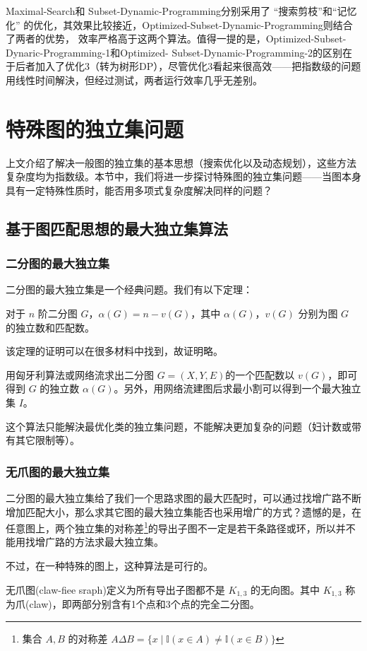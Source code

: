 \documentclass[lang=cn,11pt,a4paper]{elegantpaper}
\newcommand{\I}{\mathbb{I}}
\begin{document}
Maximal-Search和 Subset-Dynamic-Programming分别采用了 “搜索剪枝”和“记忆化” 的优化，其效果比较接近，Optimized-Subset-Dynamic-Programming则结合了两者的优势， 效率严格高于这两个算法。值得一提的是，Optimized-Subset-Dynaric-Programming-1和Optimized- Subset-Dynamic-Programming-2的区别在于后者加入了优化3（转为树形DP），尽管优化3看起来很高效——把指数级的问题用线性时间解決，但经过测试，两者运行效率几乎无差别。

\section{特殊图的独立集问题}
上文介绍了解决一般图的独立集的基本思想（搜索优化以及动态规划），这些方法复杂度均为指数级。本节中，我们将进一步探讨特殊图的独立集问题——当图本身具有一定特殊性质时，能否用多项式复杂度解决同样的问题？

\subsection{基于图匹配思想的最大独立集算法}
\subsubsection{二分图的最大独立集}
二分图的最大独立集是一个经典问题。我们有以下定理：
\begin{theorem}
    对于 $n$ 阶二分图 $G$，$\alpha(G) = n - v(G)$，其中 $\alpha(G)$，$v(G)$ 分别为图 $G$ 的独立数和匹配数。
\end{theorem}

该定理的证明可以在很多材料中找到，故证明略。

用匈牙利算法或网络流求出二分图 $G =(X, Y, E)$的一个匹配数以 $v(G)$，即可得到 $G$ 的独立数 $\alpha(G)$。另外，用网络流建图后求最小割可以得到一个最大独立集 $I$。

这个算法只能解決最优化类的独立集问题，不能解决更加复杂的问题（妇计数或带有其它限制等）。

\subsubsection{无爪图的最大独立集}
二分图的最大独立集给了我们一个思路求图的最大匹配时，可以通过找增广路不断增加匹配大小，那么求其它图的最大独立集能否也采用增广的方式？遗憾的是，在任意图上，两个独立集的对称差\footnote{集合 $A, B$ 的对称差 $A \Delta B = \{x \mid \I(x \in A) \neq \I(x \in B)\}$}的导出子图不一定是若干条路径或环，所以并不能用找增广路的方法求最大独立集。

不过，在一种特殊的图上，这种算法是可行的。
\begin{definition}
    无爪图(claw-fiee sraph)定义为所有导出子图都不是 $K_{1, 3}$ 的无向图。其中 $K_{1, 3}$ 称为爪(claw)，即两部分别含有1个点和3个点的完全二分图。
\end{definition}
\end{document}
